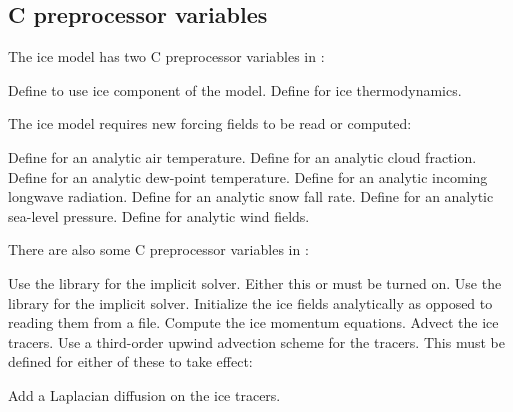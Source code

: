 \subsection{C preprocessor variables}
The ice model has two C preprocessor variables in :
\begin{klist}
   Define to use ice component of the model.
   Define for ice thermodynamics.
\end{klist}

The ice model requires new forcing fields to be read or computed:
\begin{klist}
     Define for an analytic air temperature.
    Define for an analytic cloud fraction.
     Define for an analytic dew-point temperature.
   Define for an analytic incoming longwave
radiation.
     Define for an analytic snow fall rate.
      Define for an analytic sea-level pressure.
     Define for analytic wind fields.
\end{klist}

There are also some C preprocessor variables in :
\begin{klist}
    Use the  library for the implicit solver.
Either this or  must be turned on.
    Use the  library for the implicit solver.
    Initialize the ice fields analytically as
opposed to reading them from a file.
    Compute the ice momentum equations.
    Advect the ice tracers.
     Use a third-order upwind advection scheme for
the tracers. This must be defined for either of these to take effect:
    \begin{klist}
        Add a Laplacian diffusion on the ice
     tracers.
    \end{klist}
\end{klist}

